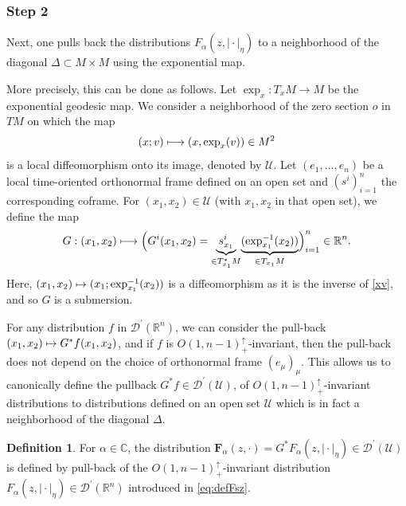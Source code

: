 \documentclass[JEP,XML,SOM,Unicode]{cedram}
\let\pazocal\mathscr
\def\mto{\mathchoice{\longmapsto}{\mapsto}{\mapsto}{\mapsto}}
\theoremstyle{definition}
\newtheorem{definition}[theorem]{Definition}
\newcommand\cc{{\mathbb C}}
\newcommand\cU{{\pazocal U}}
\let\diag\Delta
\let\cv\alpha
\let\varalpha s
\newcommand\zero{{\textit{o}}}
\newcommand{\Fse}[2][\cv]{F_{#1}(#2,\vert{\cdot} \vert_\eta)}
\newcommand{\Fe}[2][\cv]{\mathbf{F}_{#1}(#2, \cdot)}
\begin{document}
\subsubsection*{Step 2} Next, one pulls back the distributions $\Fse{z}$ to a neighborhood of the diagonal $\diag\subset M\times M$ using the exponential map.

More precisely, this can be done as follows. Let $\exp_x:T_xM\to M$ be the exponential geodesic map. We consider a neighborhood
of the zero section $\zero $ in $TM$
on which the
map
\begin{equation} \label{xv}
(x;v)\mto (x,\exp_x(v))\in M^2
\end{equation}
is a local
diffeomorphism
onto its image, denoted by $\pazocal{U}$.
Let
{$(e_1,\dots,e_n)$} be a local time-oriented orthonormal frame
defined on an open set and {$(\varalpha^i)_{i=1}^n$} the corresponding coframe. For $(x_1,x_2)\in\pazocal{U}$ (with $x_1,x_2$ in that open set), we define the map
\begin{equation*}%
G: (x_1,x_2)\mto {
\Big(G^i(x_1,x_2)=
\underset{\in T_{x_1}^* M}{\underbrace{\varalpha^i_{x_1}}}\underset{\in T_{x_1}M}{\underbrace{(\exp_{x_1}^{-1}(x_2))} } \Big)_{i=1}^n \in\mathbb{R}^{n}.}
\end{equation*}
Here, $(x_1,x_2) \mto (x_1;\exp_{x_1}^{-1}(x_2))$ is a diffeomorphism as it is the inverse of \eqref{xv}, and so $G$ is a submersion.

For any distribution $f$ in
$\pazocal{D}^\prime(\mathbb{R}^{n})$, we can consider the pull-back $(x_1,x_2)\mto G^*f(x_1,x_2)$, and if $f$ is $O(1,n-1)_+^\uparrow$-invariant,
then
the pull-back does not depend on the choice
of orthonormal frame $(e_\mu)_\mu$. This allows us to canonically define the pullback $G^*f\in \pazocal{D}^\prime(\cU)$, of
$O(1,n-1)_+^\uparrow$-invariant
distributions to distributions
defined on an open set $\pazocal{U}$ which is in fact a neighborhood
of the diagonal $\diag$.

\begin{definition}\label{d:fsneardiag}
For $\cv\in\cc$, the distribution
$\Fe{z}= G^*\Fse{z}\in \pazocal{D}^\prime(\pazocal{U})$ is defined by pull-back of the $O(1,n-1)_+^\uparrow$-invariant distribution $\Fse{z}\in \pazocal{D}^\prime\left(\mathbb{R}^{n}\right)$ introduced in \eqref{eq:defFsz}.
\end{definition}
\end{document}
